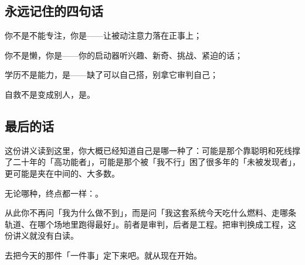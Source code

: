\subsection{永远记住的四句话}

\begin{checklist}
  \item 你不是不能专注，你是——让被动注意力落在正事上；
  \item 你不是懒，你是——你的启动器听兴趣、新奇、挑战、紧迫的话；
  \item 学历不是能力，是——缺了可以自己搭，别拿它审判自己；
  \item 自救不是变成别人，是。
\end{checklist}

\subsection{最后的话}

这份讲义读到这里，你大概已经知道自己是哪一种了：可能是那个靠聪明和死线撑了二十年的「高功能者」，可能是那个被「我不行」困了很多年的「未被发现者」，更可能是夹在中间的、大多数。

无论哪种，终点都一样：。

从此你不再问「我为什么做不到」，而是问「我这套系统今天吃什么燃料、走哪条轨道、在哪个场地里跑得最好」。前者是审判，后者是工程。把审判换成工程，这份讲义就没有白读。

去把今天的那件「一件事」定下来吧。就从现在开始。
